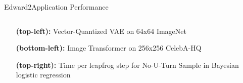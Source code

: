 \documentclass[AERbeamer%
              ,optEnglish%
              ,optBiber%
              ,optBibstyleAlphabetic%
              ,optBeamerClassicFormat%
              ]{AERlatex}%
\begin{document}
\begin{frame}[c]{Edward2}{Application Performance}
\begin{columns}[T]
\begin{column}{0.48\textwidth}
\begin{figure}
            \end{figure}
            \vspace{0.5cm}
            \begin{itemize}
                \item[\textbf{(top-left):}] Vector-Quantized VAE on 64x64 ImageNet
                \item[\textbf{(bottom-left):}] Image Transformer on 256x256 CelebA-HQ
                \item[\textbf{(top-right):}] Time per leapfrog step for No-U-Turn Sample in Bayesian logistic regression 
            \end{itemize}
        \end{column}
    \end{columns}
\end{frame}
\end{document}
